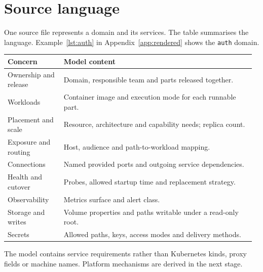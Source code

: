 \section{Source language}

One source file represents a domain and its services. The table summarises the
language. Example~\ref{lst:auth} in Appendix~\ref{app:rendered} shows the
\texttt{auth} domain.

{\footnotesize
\setlength{\tabcolsep}{5pt}
\renewcommand{\arraystretch}{1.25}
\noindent\begin{tabular}{@{}p{0.22\linewidth}p{0.75\linewidth}@{}}
\hline
\textbf{Concern} & \textbf{Model content} \\
\hline
Ownership and release & Domain, responsible team and parts released together. \\
Workloads & Container image and execution mode for each runnable part. \\
Placement and scale & Resource, architecture and capability needs; replica count. \\
Exposure and routing & Host, audience and path-to-workload mapping. \\
Connections & Named provided ports and outgoing service dependencies. \\
Health and cutover & Probes, allowed startup time and replacement strategy. \\
Observability & Metrics surface and alert class. \\
Storage and writes & Volume properties and paths writable under a read-only root. \\
Secrets & Allowed paths, keys, access modes and delivery methods. \\
\hline
\end{tabular}}

The model contains service requirements rather than Kubernetes kinds, proxy
fields or machine names. Platform mechanisms are derived in the next stage.
